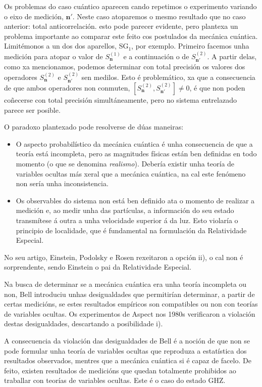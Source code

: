 \documentclass[a4paper,12pt]{article}
\begin{document}
Os problemas do caso cuántico aparecen cando repetimos o experimento variando o eixo de medición, $\textbf{n}'$. Neste caso atoparemos o mesmo resultado que no caso anterior: total anticorrelación. esto pode parecer evidente, pero plantexa un problema importante ao comparar este feito cos postulados da mecánica cuántica.
Limitémonos a un dos dos aparellos, SG$_1$, por exemplo. Primeiro facemos unha medición para atopar o valor de $S_\textbf{n}^{(1)}$ e a continuación o de $S_{\textbf{n}'}^{(2)}$. A partir delas, como xa mencionamos, podemos determinar con total precisión os valores dos operadores $S_{\textbf{n}}^{(2)}$ e $S_{\textbf{n}'}^{(2)}$ sen medilos.
Esto é problemático, xa que a consecuencia de que ambos operadores non conmuten, $[S_{\textbf{n}}^{(2)}, S_{\textbf{n}'}^{(2)}] \neq 0$, é que non poden coñecerse con total precisión simultáneamente, pero no sistema entrelazado parece ser posible.

O paradoxo plantexado pode resolverse de dúas maneiras:
\begin{itemize}
	\item[i)] O aspecto probabilístico da mecánica cuántica é unha consecuencia de que a teoría está incompleta, pero as magnitudes físicas están ben definidas en todo momento (o que se denomina \textit{realismo}). Debería existir unha teoría de variables ocultas más xeral que a mecánica cuántica, na cal este fenómeno non sería unha inconsistencia.

	\item[ii)] Os observables do sistema non está ben definido ata o momento de realizar a medición e, ao medir unha das partículas, a información do seu estado transmítese á outra a unha velocidade superior á da luz. Esto violaría o principio de localidade, que é fundamental na formulación da Relatividade Especial.
\end{itemize}
No seu artigo, Einstein, Podolsky e Rosen rexeitaron a opción ii), o cal non é sorprendente, sendo Einstein o pai da Relatividade Especial.

Na busca de determinar se a mecánica cuántica era unha teoría incompleta ou non, Bell introduciu unhas desigualdades que permitirían determinar, a partir de certas medicións, se estes resultados empíricos son compatibles ou non con teorías de variables ocultas. Os experimentos de Aspect nos 1980s verificaron a violación destas desigualdades, descartando a posibilidade i).

A consecuencia da violación das desigualdades de Bell é a noción de que non se pode formular unha teoría de variables ocultas que reproduza a estatística dos resultados observados, mentres que a mecánica cuántica si é capaz de facelo.
De feito, existen resultados de medicións que quedan totalmente prohibidos ao traballar con teorías de variables ocultas. Este é o caso do estado GHZ. 
\end{document}
